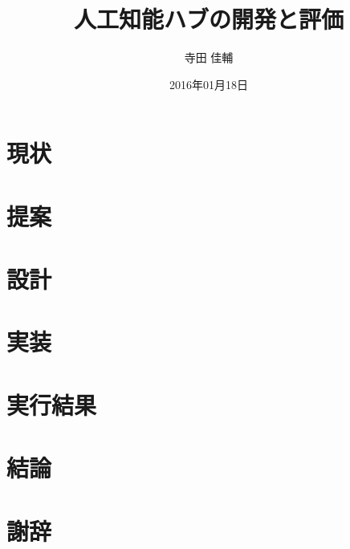 \documentclass[a4paper,10pt,onecolumn,oneside,openany]{jsbook}
\author{寺田 佳輔}										%
\title{人工知能ハブの開発と評価}				%
\date{2016年01月18日}									%
\begin{document}



\chapter{現状}




\chapter{提案}



\chapter{設計}


\chapter{実装}

\chapter{実行結果}

\chapter{結論}


\chapter*{謝辞}



\end{document}
